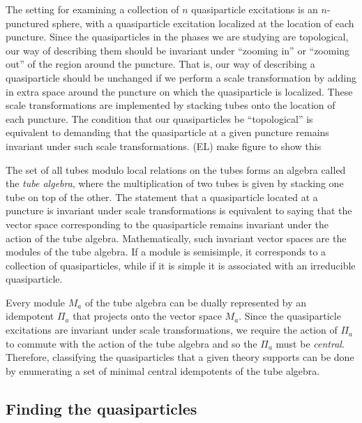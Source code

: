 \documentclass[12pt,a4paper]{article}
\newcommand{\ethan}[1]{{\color{amethyst}\footnotesize{(EL) #1}}}
\begin{document}
The setting for examining a collection of $n$ quasiparticle excitations is an $n$-punctured sphere, with a quasiparticle excitation localized at the location of each puncture. 
Since the quasiparticles in the phases we are studying are topological, our way of describing them should be invariant under ``zooming in'' or ``zooming out'' of the region around the puncture. That is, our way of describing a quasiparticle should be unchanged if we perform a scale transformation by adding in extra space around the puncture on which the quasiparticle is localized. These scale transformations are implemented by stacking tubes onto the location of each puncture. The condition that our quasiparticles be ``topological'' is equivalent to demanding that the quasiparticle at a given puncture remains invariant under such scale transformations. \ethan{make figure to show this}

The set of all tubes modulo local relations on the tubes forms an algebra called the {\it tube algebra}, where the multiplication of two tubes is given by stacking one tube on top of the other. The statement that a quasiparticle located at a puncture is invariant under scale transformations is equivalent to saying that the vector space corresponding to the quasiparticle remains invariant under the action of the tube algebra. Mathematically, such invariant vector spaces are the modules of the tube algebra. If a module is semisimple, it corresponds to a collection of quasiparticles, while if it is simple it is associated with an irreducible quasiparticle. 

Every module $M_a$ of the tube algebra can be dually represented by an idempotent $\Pi_a$ that projects onto the vector space $M_a$. Since the quasiparticle excitations are invariant under scale transformations, we require the action of $\Pi_a$ to commute with the action of the tube algebra and so the $\Pi_a$ must be {\it central}. Therefore, classifying the quasiparticles that a given theory supports can be done by enumerating a set of minimal central idempotents of the tube algebra. 

\subsection{Finding the quasiparticles}
\end{document}

